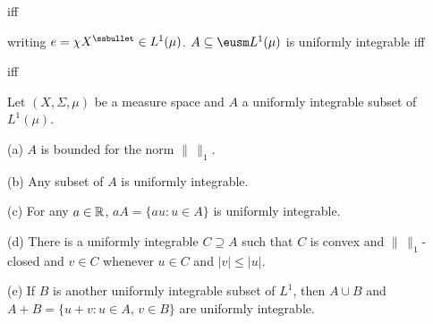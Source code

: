 
\noindent iff


\noindent writing $e=\chi X^{\ssbullet}\in L^1(\mu)$.   
$A\subseteq\eusm L^1(\mu)$ is uniformly integrable
iff


\noindent iff



 Let $(X,\Sigma,\mu)$ be a measure space and
$A$ a uniformly integrable subset of $L^1(\mu)$.

(a) $A$ is bounded for the norm $\|\,\|_1$.

(b) Any subset of $A$ is uniformly integrable.

(c) For any $a\in\Bbb R$, $aA=\{au:u\in A\}$ is uniformly integrable.

(d) There is a uniformly integrable $C\supseteq A$ such that $C$ is
convex and $\|\,\|_1$-closed and $v\in C$ whenever $u\in C$ and
$|v|\le|u|$.

(e) If $B$ is another uniformly integrable subset of $L^1$, then
$A\cup B$ and $A+B=\{u+v:u\in A,\,v\in B\}$ are uniformly integrable.

